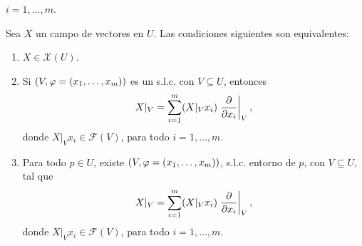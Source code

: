 \documentclass[cursovd_portada.tex]{subfiles}
\begin{document}
$i=1,\dots ,m$.
\begin{prop}
Sea $X$ un campo de vectores en $U$. Las condiciones siguientes son equivalentes:
\begin{enumerate}
\item $X\in\mathcal{X}(U)$. \item Si $(V,\varphi=(x_1,\dots ,x_m))$ es
un s.l.c. con $V\subseteq U$, entonces
$$X|_V=\sum_{i=1}^m(X|_Vx_i)\left.\displaystyle{\frac{\partial}{\partial x_i}}\right\vert_V,$$
donde $X|_Vx_i\in\mathcal{F}(V)$, para todo $i=1,\dots ,m$. \item
Para todo $p\in U$, existe $(V,\varphi=(x_1,\dots ,x_m))$, s.l.c.
entorno de $p$, con $V\subseteq U$, tal que
$$X|_V=\sum_{i=1}^m(X|_Vx_i)\left.\displaystyle{\frac{\partial}{\partial x_i}}\right\vert_V,$$
donde $X|_Vx_i\in\mathcal{F}(V)$, para todo $i=1,\dots ,m$.
\end{enumerate}
\end{prop}

\
\end{document}
